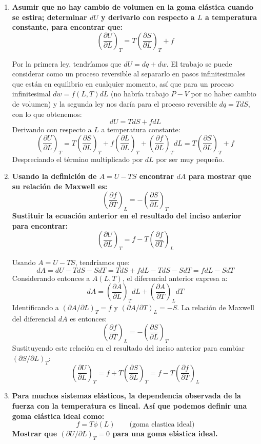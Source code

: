 \documentclass[a4paper,12pt]{article}
\begin{document}
\begin{enumerate}
 \begin{enumerate}
  \item \textbf{Asumir que no hay cambio de volumen en la goma el\'astica cuando se estira; determinar $dU$ y derivarlo con respecto a $L$ a temperatura constante, para encontrar que:}
$$\left(\frac{\partial U}{\partial L}\right)_T=T\left(\frac{\partial S}{\partial L}\right)_T+f$$

Por la primera ley, tendr\'iamos que $dU=dq+dw$. El trabajo se puede considerar como un proceso reversible al separarlo en pasos infinitesimales que est\'an en equilibrio en cualquier momento, as\'i que para un proceso infinitesimal $dw=f(L,T)dL$ (no habr\'ia trabajo $P-V$ por no haber cambio de volumen) y la segunda ley nos dar\'ia para el proceso reversible $dq=TdS$, con lo que obtenemos:
$$dU=TdS+fdL$$
Derivando con respecto a $L$ a temperatura constante:
$$\left(\frac{\partial U}{\partial L}\right)_T=T\left(\frac{\partial S}{\partial L}\right)_T+f\left(\frac{\partial L}{\partial L}\right)_T+\left(\frac{\partial f}{\partial L}\right)_TdL=T\left(\frac{\partial S}{\partial L}\right)_T+f$$
Despreciando el t\'ermino multiplicado por $dL$ por ser muy peque\~no.

  \item \textbf{Usando la definici\'on de $A=U-TS$ encontrar $dA$ para mostrar que su relaci\'on de Maxwell es:}
$$\left(\frac{\partial f}{\partial T}\right)_L=-\left(\frac{\partial S}{\partial L}\right)_T$$
\textbf{Sustituir la ecuaci\'on anterior en el resultado del inciso anterior para encontrar:}
$$\left(\frac{\partial U}{\partial L}\right)_T=f-T\left(\frac{\partial f}{\partial T}\right)_L$$

Usando $A=U-TS$, tendr\'iamos que:
$$dA=dU-TdS-SdT=TdS+fdL-TdS-SdT=fdL-SdT$$
Considerando entonces a $A(L,T)$, el diferencial anterior expresa a:
$$dA=\left(\frac{\partial A}{\partial L}\right)_TdL+\left(\frac{\partial A}{\partial T}\right)_LdT$$
Identificando a $(\partial A/\partial L)_T=f$ y $(\partial A/\partial T)_L=-S$. La relaci\'on de Maxwell del diferencial $dA$ es entonces:
$$\left(\frac{\partial f}{\partial T}\right)_L=-\left(\frac{\partial S}{\partial L}\right)_T$$
Sustituyendo este relaci\'on en el resultado del inciso anterior para cambiar $(\partial S/\partial L)_T$:
$$\left(\frac{\partial U}{\partial L}\right)_T=f+T\left(\frac{\partial S}{\partial L}\right)_T=f-T\left(\frac{\partial f}{\partial T}\right)_L$$

  \item \textbf{Para muchos sistemas el\'asticos, la dependencia observada de la fuerza con la temperatura es lineal. As\'i que podemos definir una goma el\'astica ideal como:}
$$f=T\phi(L)\quad\quad\mbox{(goma elastica ideal)}$$
\textbf{Mostrar que $(\partial U/\partial L)_T=0$ para una goma el\'astica ideal.}


\end{enumerate}
\end{enumerate}
\end{document}
